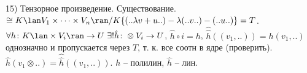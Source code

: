 15) Тензорное произведение. Существование.\\
$\cong K\lan V_1 \times \dots \times V_n \ran / K\{(..\lambda v+u..) - \lambda (..v..) - (..u..)\} = T$. $\forall h \colon K\lan\times V_i\ran \to U \ \exists ! \hat{h} \colon \otimes V_i \to U$, $\hat{h} \circ i = h$, $\hat{\hat{h}}((v_1,..)) = h(v_1,..)$ однозначно и пропускается через $T$, т. к. все соотн в ядре (проверить). $\hat{h}(v_1\otimes..) = \hat{\hat{h}}((v_1,..))$. $h$ -- полилин, $\hat{h}$ -- лин.\\
